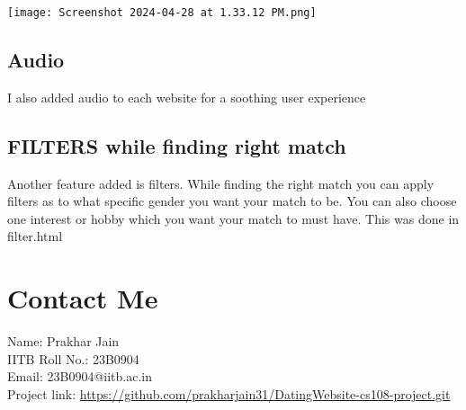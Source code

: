 \documentclass{article}
\begin{document}
\texttt{[image: Screenshot 2024-04-28 at 1.33.12 PM.png]}

\subsection{Audio}
I also added audio to each website for a soothing user experience 

\subsection{FILTERS while finding right match}
Another feature added is filters. While finding the right match you can apply filters as to what specific gender you want your match to be. You can also choose one interest or hobby which you want your match to must have.
This was done in filter.html
\section{Contact Me}
Name: Prakhar Jain \\
IITB Roll No.: 23B0904 \\
Email: 23B0904@iitb.ac.in \\
Project link: \href{https://github.com/prakharjain31/DatingWebsite-cs108-project.git}{https://github.com/prakharjain31/DatingWebsite-cs108-project.git}
\end{document}
